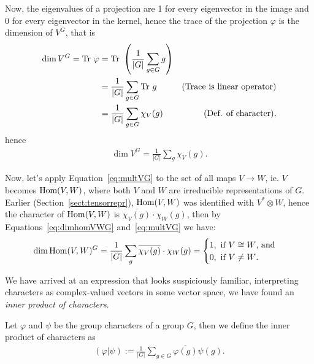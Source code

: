 Now, the eigenvalues of a projection are 1 for every eigenvector in the image and 0 for every eigenvector in the kernel, hence the trace of the projection $\varphi$ is the dimension of $V^G$, that is
\begin{align*}
	\dim V^G = \text{Tr } \varphi &= \text{Tr } \left( \frac{1}{|G|} \sum_{g \in G} g \right) \\
	&= \frac{1}{|G|} \sum_{g \in G} \text{Tr } g & \text{(Trace is linear operator)} \\
	&= \frac{1}{|G|} \sum_{g \in G} \chi_{V}(g) & \text{(Def. of character)},
\end{align*}
hence \begin{align}\label{eq:multVG}
	\dim V^G = \frac{1}{|G|} \sum_g \chi_V(g).
\end{align}

Now, let's apply Equation~\ref{eq:multVG} to the set of all maps $V \rightarrow W$, ie. $V$ becomes $\text{Hom} (V,W)$, where both $V$ and $W$ are irreducible representations of $G$. Earlier (Section~\ref{sect:tensorrepr}), $\text{Hom}(V,W)$ was identified with $V^* \otimes W$, hence the character of $\text{Hom}(V,W)$ is $\overline{\chi_V(g)}\cdot\chi_W(g)$, then by Equations~\ref{eq:dimhomVWG} and~\ref{eq:multVG} we have:
\begin{align*}
	\dim \text{Hom}(V,W)^G = \frac{1}{|G|} \sum_g \overline{\chi_V(g)}\cdot\chi_W(g) = \begin{cases}
		1, \text{ if $V \cong W$, and} \\
		0, \text{ if $V \neq W$.}
	\end{cases}
\end{align*}

We have arrived at an expression that looks suspiciously familiar, interpreting characters as complex-valued vectors in some vector space, we have found an \textit{inner product of characters}.

\begin{definition}
	Let $\varphi$ and $\psi$ be the group characters of a group $G$, then we define the inner product of characters as
	\begin{align*}
		(\varphi | \psi) := \frac{1}{|G|} \sum_{g \in G} \overline{\varphi(g)} {\psi(g)}.
	\end{align*}
\end{definition}

